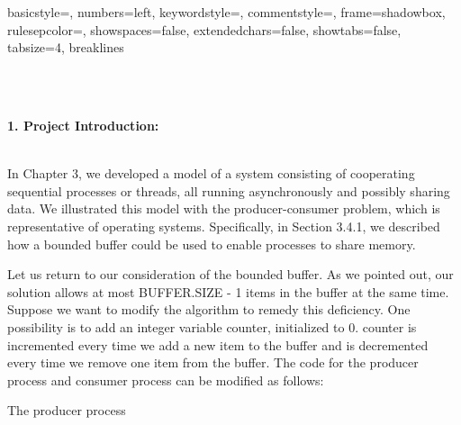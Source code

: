 \documentclass[12pt,a4paper]{article}
\begin{document}
\noindent

\lstset
{
	basicstyle=\ttfamily,
	numbers=left,
	keywordstyle=\color[RGB]{0,0,255},
	commentstyle=\color[RGB]{0,128,0},
	frame=shadowbox,
	rulesepcolor=\color{red!20!green!20!blue!20},
	showspaces=false,
	extendedchars=false,
	showtabs=false,
	tabsize=4, breaklines
}

\noindent{}
~\\
~\\
\begin{large}
\textbf{1. Project Introduction:}
\end{large}
~\\

In Chapter 3, we developed a model of a system consisting of cooperating sequential processes or threads, all running asynchronously and possibly sharing data. We illustrated this model with the producer-consumer problem, which is representative of operating systems. Specifically, in Section 3.4.1, we described how a bounded buffer could be used to enable processes to share memory. 

Let us return to our consideration of the bounded buffer. As we pointed out, our solution allows at most BUFFER.SIZE - 1 items in the buffer at the same time. Suppose we want to modify the algorithm to remedy this deficiency. One possibility is to add an integer variable counter, initialized to 0. counter is incremented every time we add a new item to the buffer and is decremented every time we remove one item from the buffer. The code for the producer process and consumer process can be modified as follows:

\begin{algorithm}[H]
  \SetAlgoLined
  
  \BlankLine
  
  \caption{The producer process}
  \end{algorithm}
\end{document}

